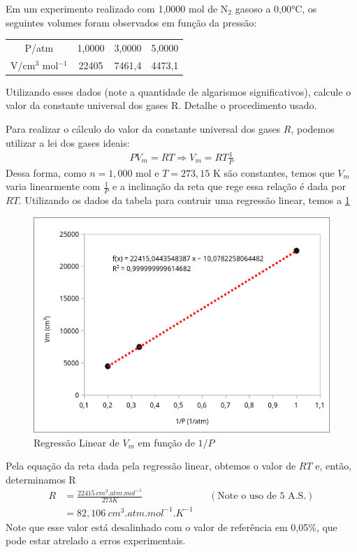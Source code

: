 \begin{xcs}
    Em um experimento realizado com 1,0000 mol de N\(_2\) gasoso a 0,00°C, os
    seguintes volumes foram observados em função da pressão: 
    \begin{center}
    \begin{tabular}{c | c c c}
    \hline
        P/atm & 1,0000 & 3,0000 & 5,0000\\
        V/cm\(^3\) mol\(^{-1}\) & 22405 & 7461,4 & 4473,1\\
    \hline
    \end{tabular}
    \end{center}
    Utilizando esses dados (note a quantidade de algarismos significativos),
    calcule o valor da constante universal dos gases R. Detalhe o procedimento
    usado.
\end{xcs}
\begin{rsl}
    
    Para realizar o cálculo do valor da constante universal dos gases \( R \),
    podemos utilizar a lei dos gases ideais: 
    \begin{align*}
        PV_m = RT \Rightarrow 
        V_m = RT \frac{1}{P} 
    \end{align*}
    Dessa forma, como \( n = 1,000 \) mol e \( T = 273,15 \) K são constantes,
    temos que \( V_m \) varia linearmente com \( \frac{1}{P} \) e a inclinação
    da reta que rege essa relação é dada por \( RT \). Utilizando os dados
    da tabela para contruir uma regressão linear, temos a \cref{reggeo} 
    \begin{figure}[H]
        \centering
        \includegraphics[width=.4\linewidth]{images/geo1.png}
        \caption{Regressão Linear de \(V_m\) em função de \( 1/P \) }
        \label{reggeo}
    \end{figure}
    Pela equação da reta dada pela regressão linear, obtemos o valor de \( RT \)
    e, então, determinamos R
    \begin{align*}
        R &= \frac{22415 \ \unit{cm^3.atm.mol^{-1}} }{273K} && (\text{Note o uso
        de 5 A.S.})\\
        &= 82,106 \ \unit{cm^3.atm.mol^{-1}.K^{-1}}
    \end{align*}
    Note que esse valor está desalinhado com o valor de referência em 0,05\%, que pode estar atrelado a erros experimentais.

\end{rsl}

